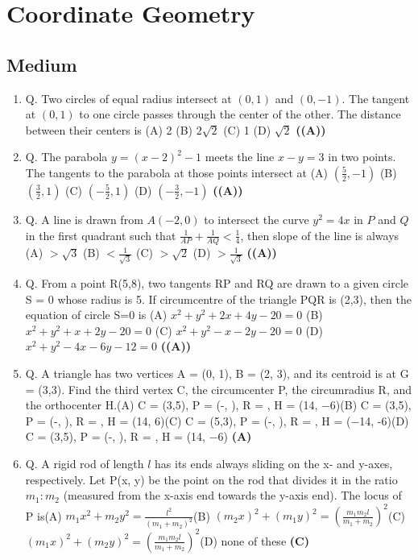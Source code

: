 \documentclass{article}
\begin{document}
\section{Coordinate Geometry}
\subsection{Medium}
\begin{enumerate}
\item Q. Two circles of equal radius intersect at $(0,1)$ and $(0, -1)$. The tangent at $(0,1)$ to one circle passes through the center of the other. The distance between their centers is
(A) 2
(B) $2\sqrt{2}$
(C) 1
(D) $\sqrt{2}$ \hfill \textbf{((A))}
\item Q. The parabola $y = (x - 2)^2 - 1$ meets the line $x - y = 3$ in two points. The tangents to the parabola at those points intersect at
(A) $(\frac{5}{2},-1)$
(B) $(\frac{3}{2},1)$
(C) $(-\frac{5}{2},1)$
(D) $(-\frac{3}{2},-1)$ \hfill \textbf{((A))}
\item Q. A line is drawn from $A(-2,0)$ to intersect the curve $y^2 = 4x$ in $P$ and $Q$ in the first quadrant such that $\frac{1}{AP}+\frac{1}{AQ} < \frac{1}{4}$, then slope of the line is always
(A) $> \sqrt{3}$
(B) $< \frac{1}{\sqrt{3}}$
(C) $> \sqrt{2}$
(D) $> \frac{1}{\sqrt{3}}$ \hfill \textbf{((A))}
\item Q. From a point R(5,8), two tangents RP and RQ are drawn to a given circle S = 0 whose radius is 5. If circumcentre of the triangle PQR is (2,3), then the equation of circle S=0 is
(A) $x^2 + y^2 + 2x + 4y - 20 = 0$
(B) $x^2 + y^2 + x + 2y - 20 = 0$
(C) $x^2 + y^2 - x - 2y - 20 = 0$
(D) $x^2 + y^2 - 4x - 6y - 12 = 0$ \hfill \textbf{((A))}
\item Q. A triangle has two vertices A = (0, 1), B = (2, 3), and its centroid is at G = (3,3). Find the third vertex C, the circumcenter P, the circumradius R, and the orthocenter H.\n(A) C = (3,5), P = (-, ), R = , H = (14, −6)\n(B) C = (3,5), P = (-, ), R = , H = (14, 6)\n(C) C = (5,3), P = (-, ), R = , H = (−14, -6)\n(D) C = (3,5), P = (-, ), R = , H = (14, −6) \hfill \textbf{(A)}
\item Q. A rigid rod of length $l$ has its ends always sliding on the x- and y-axes, respectively. Let P(x, y) be the point on the rod that divides it in the ratio $m_1 : m_2$ (measured from the x-axis end towards the y-axis end). The locus of P is\n(A) $m_1 x^2 + m_2 y^2 = \frac{l^2}{(m_1 + m_2)^2}$\n(B) $(m_2 x)^2 + (m_1 y)^2 = (\frac{m_1 m_2 l}{m_1+m_2})^2$\n(C) $(m_1 x)^2 + (m_2 y)^2 = (\frac{m_1 m_2 l}{m_1+m_2})^2$\n(D) none of these \hfill \textbf{(C)}

\end{enumerate}
\end{document}
